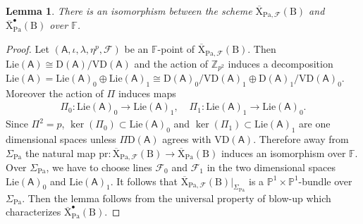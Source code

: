 \documentclass[10pt]{amsart}
\numberwithin{equation}{section}
\newtheorem{lemma}[equation]{Lemma}
\theoremstyle{definition}
\def\Lie{\mathrm{Lie}}
\def\Pa{\mathrm{Pa}}
\def\calF{\mathcal{F}}
\def\FF{\mathbb{F}}
\def\PP{\mathbb{P}}
\def\ZZ{\mathbb{Z}}
\def\sfA{\mathsf{A}}
\def\rmB{\mathrm{B}}
\def\rmD{\mathrm{D}}
\def\rmV{\mathrm{V}}
\def\rmX{\mathrm{X}}
\begin{document}
\begin{lemma}\label{moduli-bullet}
There is an isomorphism between the scheme $\overline{\rmX}_{\Pa,\calF}(\rmB)$ and $\overline{\rmX}^{\bullet}_{\Pa}(\rmB)$ over $\FF$.
\end{lemma}
\begin{proof}
Let $(\sfA, \iota , \lambda, \eta^{p}, \calF)$ be an $\FF$-point of $\overline{\rmX}_{\Pa,\calF}(\rmB)$. Then $\Lie(\sfA)\cong\rmD(\sfA)/\rmV \rmD(\sfA)$ and the action of $\ZZ_{p^{2}}$ induces a decomposition $\Lie(\sfA)=\Lie(\sfA)_{0}\oplus\Lie(\sfA)_{1}\cong\rmD(\sfA)_{0}/\rmV \rmD(\sfA)_{1}\oplus \rmD(\sfA)_{1}/\rmV \rmD(\sfA)_{0}$. Moreover the action of $\Pi$ induces maps
\begin{equation*}
\begin{aligned}
\Pi_{0}: \Lie(\sfA)_{0}\rightarrow \Lie(\sfA)_{1}, \phantom{aa}\Pi_{1}: \Lie(\sfA)_{1}\rightarrow \Lie(\sfA)_{0}.
\end{aligned}
\end{equation*}
Since $\Pi^{2}=p$, $\ker(\Pi_{0})\subset\Lie(\sfA)_{0}$ and $\ker(\Pi_{1})\subset\Lie(\sfA)_{1}$ are one dimensional spaces unless $\Pi\rmD(\sfA)$ agrees with $\rmV\rmD(\sfA)$. Therefore away from $\Sigma_{\Pa}$ the natural map $\mathrm{pr}:\overline{\rmX}_{\Pa,\calF}(\rmB)\rightarrow \overline{\rmX}_{\Pa}(\rmB)$ induces an isomorphism over $\FF$. Over $\Sigma_{\Pa}$, we have to choose  lines $\calF_{0}$ and $\calF_{1}$ in the two dimensional spaces $\Lie(\sfA)_{0}$ and  $\Lie(\sfA)_{1}$. It follows that $\overline{\rmX}_{\Pa, \calF}(\rmB)\vert_{\Sigma_{\Pa}}$ is a $\PP^{1}\times\PP^{1}$-bundle over $\Sigma_{\Pa}$. Then the lemma follows from the universal property of blow-up which characterizes $\overline{\rmX}^{\bullet}_{\Pa}(\rmB)$.
\end{proof}
\end{document}

